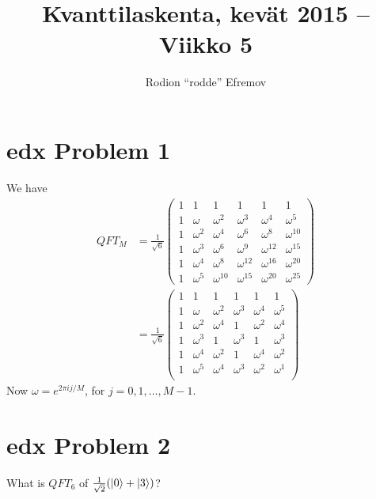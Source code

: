 \documentclass[10pt]{article}
\title{Kvanttilaskenta, kevät 2015 -- Viikko 5}
\author{Rodion ``rodde'' Efremov}
\begin{document}
 \maketitle

\section*{edx Problem 1}
We have
\begin{align*}
QFT_M &= 
\frac{1}{\sqrt{6}}
\begin{pmatrix}
1 & 1 & 1 & 1 & 1 & 1 \\
1 & \omega & \omega^{2} & \omega^{3} & \omega^{4} & \omega^{5} \\
1 & \omega^{2} & \omega^{4} & \omega^{6} & \omega^{8} & \omega^{10} \\
1 & \omega^{3} & \omega^{6} & \omega^{9} & \omega^{12} & \omega^{15} \\
1 & \omega^{4} & \omega^{8} & \omega^{12} & \omega^{16} & \omega^{20} \\
1 & \omega^{5} & \omega^{10} & \omega^{15} & \omega^{20} & \omega^{25} 
\end{pmatrix} \\
&= 
\frac{1}{\sqrt{6}}
\begin{pmatrix}
1 & 1 & 1 & 1 & 1 & 1 \\
1 & \omega & \omega^{2} & \omega^{3} & \omega^{4} & \omega^{5} \\
1 & \omega^{2} & \omega^{4} & 1 & \omega^{2} & \omega^{4} \\
1 & \omega^{3} & 1 & \omega^{3} & 1 & \omega^{3} \\
1 & \omega^{4} & \omega^{2} & 1 & \omega^{4} & \omega^{2} \\
1 & \omega^{5} & \omega^{4} & \omega^{3} & \omega^{2} & \omega^{1} \\
\end{pmatrix}
\end{align*}
Now $\omega = e^{2\pi i j / M}$, for $j = 0, 1, \dots, M - 1$.

\section*{edx Problem 2}
What is $QFT_6$ of $\frac{1}{\sqrt{2}} (\ket{0} + \ket{3})$? 
\end{document}
